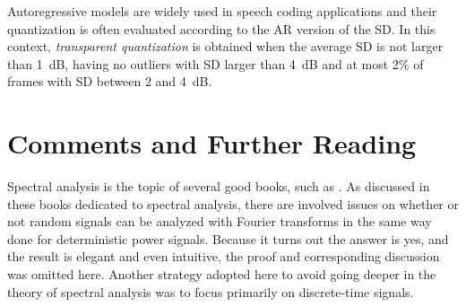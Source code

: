 Autoregressive models are widely used in speech coding applications and their quantization is often evaluated according to the AR version of the SD. In this context, \emph{transparent quantization} is obtained when the average SD is not larger than 1~dB, having no outliers with SD larger than 4~dB and at most 2\% of frames with SD between 2 and 4~dB.
\eApplication





%
%

\section{Comments and Further Reading}
\label{sec:spectral_further}

Spectral analysis is the topic of several good books, such as \cite{Stoica05}.
As discussed in these books dedicated to spectral analysis, there are involved issues on whether or not random signals can be analyzed with Fourier transforms in the same way done for deterministic power signals. Because it turns out the answer is yes, and the result is elegant and even intuitive, the proof and corresponding discussion was omitted here.
Another strategy adopted here to avoid going deeper in the theory of spectral analysis was to focus primarily on discrete-time signals.


